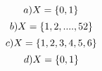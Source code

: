 \documentclass[12pt]{article}
\begin{document}
\medskip
{} 
\medskip
\newline
$$
a)
\newline
X=\{0,1\}
\newline
$$
$$
b)
\newline
X=\{1,2,....,52\}
\newline
$$
$$
c)
\newline
X=\{1,2,3,4,5,6\}
\newline
$$
$$
d)
\newline
X=\{0,1\}
$$
\end{document}

